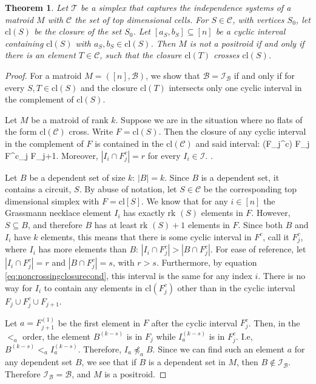 \documentclass[11pt]{article}
\newcommand{\sanote}{\todo[color=violet!30]}
\newcommand{\rk}{\textrm{rk }}
\newcommand{\cl}{\textrm{cl}}
\def\ba #1\ea{\begin{align} #1 \end{align}}
\newcommand{\cI}{\mathcal{I}}
\newcommand{\sC}{\mathscr{C}}
\newcommand{\cB}{\mathcal{B}}
\newcommand{\cT}{\mathcal{T}}
\newtheorem{thm}{Theorem}[section]
\theoremstyle{remark}
\theoremstyle{definition}
\begin{document}
\begin{thm}
Let $\cT$ be a simplex that captures the independence systems of a matroid $M$ with $\sC$ the set of top dimensional cells. For $S \in \sC$, with vertices $S_0$, let $\cl(S)$ be the closure of the set $S_0$. Let $[a_S, b_S] \subseteq [n]$ be a cyclic interval containing $\cl(S)$ with $a_S, b_S \in \cl(S)$. Then $M$ is not a positroid if and only if there is an element $T \in \sC$, such that the closure $\cl(T)$ crosses $\cl(S)$.
\end{thm}
\begin{proof}
For a matroid $M = ([n], \cB)$, we show that $\cB = \cI_\cB$ if and only if for every $S, T \in \cl(S)$ and the closure $\cl(T)$ intersects only one cyclic interval in the complement of $\cl(S)$.

Let $M$ be a matroid of rank $k$. Suppose we are in the situation where no flats of the form $\cl(\sC)$ cross. Write $F = \cl(S)$. Then the closure of any cyclic interval in the complement of $F$ is contained in the $\cl(\sC)$ and said interval: \ba \cl(F_j^c) \subseteq F_{j} \cup F^c_{j} \cup F_{j+1}\;. \label{eq:noncrossingclosurecond}\ea Moreover, $|I_i \cap F^c_j| = r$ for every $I_i \in \cI$. \sanote{make this a lemma, not quite right... discuss}.

Let $B$ be a dependent set of size $k$: $|B| = k$. Since $B$ is a dependent set, it contains a circuit, $S$. By abuse of notation, let $S \in \sC$ be the corresponding top dimensional simplex with $F = \cl[S]$. We know that for any $i \in [n]$ the Grassmann necklace element $I_i$ has exactly $\rk(S)$ elements in $F$. However, $S \subseteq B$, and therefore $B$ has at least $\rk(S) + 1 $ elements in $F$. Since both $B$ and $I_i$ have $k$ elements, this means that there is some cyclic interval in $F^c$, call it $F^c_j$, where $I_i$ has more elements than $B$: $|I_i \cap F^c_j| > |B \cap F^c_j|$. For ease of reference, let $|I_i \cap F^c_j| = r$ and $|B \cap F^c_j|=s$, with $r > s$. Furthermore, by equation \eqref{eq:noncrossingclosurecond}, this interval is the same for any index $i$. There is no way for $I_i$ to contain any elements in $\cl(F_j^c)$ other than in the cyclic interval $F_{j} \cup F^c_{j} \cup F_{j+1}$.

Let $a = F_{j+1}^{(1)}$ be the first element in $F$ after the cyclic interval $F_j^c$. Then, in the $<_a$ order, the element $B^{(k-s)}$ is in $F_{j}$ while $I_a^{(k-s)}$ is in $F^c_{j}$. I.e, $B^{(k-s)} <_a I_a^{(k-s)}$. Therefore, $I_a \not \preceq_a B$. Since we can find such an element $a$ for any dependent set $B$, we see that if $B$ is a dependent set in $M$, then $B \not \in \cI_\cB$. Therefore $\cI_\cB = \cB$, and $M$ is a positroid.
 

\end{proof}
\end{document}
